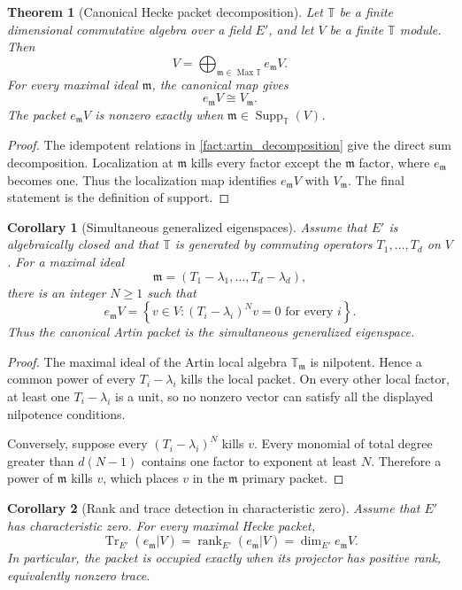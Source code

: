 \documentclass[11pt]{amsart}
\newtheorem{theorem}{Theorem}[section]
\newtheorem{corollary}[corollary]{Corollary}
\theoremstyle{definition}
\theoremstyle{remark}
\newcommand{\TT}{\mathbb T}
\newcommand{\Supp}{\operatorname{Supp}}
\newcommand{\rank}{\operatorname{rank}}
\newcommand{\Tr}{\operatorname{Tr}}
\newcommand{\Max}{\operatorname{Max}}
\newcommand{\frakm}{\mathfrak m}
\begin{document}
\begin{theorem}[Canonical Hecke packet decomposition]\label{thm:canonical_hecke_packets}
Let \(\TT\) be a finite dimensional commutative algebra over a field \(E'\), and let \(V\) be a finite \(\TT\) module. Then
\[
\boxed{
V
=
\bigoplus_{\frakm\in\Max\TT}e_{\frakm}V.
}
\]
For every maximal ideal \(\frakm\), the canonical map gives
\[
\boxed{
e_{\frakm}V\cong V_{\frakm}.}
\]
The packet \(e_{\frakm}V\) is nonzero exactly when \(\frakm\in\Supp_{\TT}(V)\).
\end{theorem}

\begin{proof}
The idempotent relations in \cref{fact:artin_decomposition} give the direct sum decomposition. Localization at \(\frakm\) kills every factor except the \(\frakm\) factor, where \(e_{\frakm}\) becomes one. Thus the localization map identifies \(e_{\frakm}V\) with \(V_{\frakm}\). The final statement is the definition of support.
\end{proof}

\begin{corollary}[Simultaneous generalized eigenspaces]\label{cor:simultaneous_generalized_eigenspaces}
Assume that \(E'\) is algebraically closed and that \(\TT\) is generated by commuting operators \(T_1,\ldots,T_d\) on \(V\). For a maximal ideal
\[
\frakm
=
(T_1-\lambda_1,\ldots,T_d-\lambda_d),
\]
there is an integer \(N\geq1\) such that
\[
\boxed{
e_{\frakm}V
=
\left\{
v\in V:
(T_i-\lambda_i)^Nv=0
\text{ for every }i
\right\}.
}
\]
Thus the canonical Artin packet is the simultaneous generalized eigenspace.
\end{corollary}

\begin{proof}
The maximal ideal of the Artin local algebra \(\TT_{\frakm}\) is nilpotent. Hence a common power of every \(T_i-\lambda_i\) kills the local packet. On every other local factor, at least one \(T_i-\lambda_i\) is a unit, so no nonzero vector can satisfy all the displayed nilpotence conditions.

Conversely, suppose every \((T_i-\lambda_i)^N\) kills \(v\). Every monomial of total degree greater than \(d(N-1)\) contains one factor to exponent at least \(N\). Therefore a power of \(\frakm\) kills \(v\), which places \(v\) in the \(\frakm\) primary packet.
\end{proof}

\begin{corollary}[Rank and trace detection in characteristic zero]\label{cor:rank_trace_detection}
Assume that \(E'\) has characteristic zero. For every maximal Hecke packet,
\[
\boxed{
\Tr_{E'}(e_{\frakm}|V)
=
\rank_{E'}(e_{\frakm}|V)
=
\dim_{E'}e_{\frakm}V.
}
\]
In particular, the packet is occupied exactly when its projector has positive rank, equivalently nonzero trace.
\end{corollary}
\end{document}
